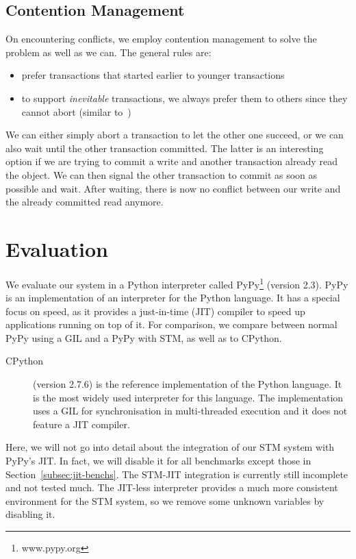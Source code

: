 \documentclass{sigplanconf}
\begin{document}
\subsection{Contention Management\label{subsub:contentionmanagement}}

On encountering conflicts, we employ contention management to solve
the problem as well as we can. The general rules are:
\begin{itemize}[noitemsep]
\item prefer transactions that started earlier to younger transactions
\item to support \emph{inevitable} transactions, we always prefer them
  to others since they cannot abort (similar to~\cite{blundell06})
\end{itemize}
We can either simply abort a transaction to let the other one succeed,
or we can also wait until the other transaction committed. The latter
is an interesting option if we are trying to commit a write and
another transaction already read the object. We can then signal the
other transaction to commit as soon as possible and wait. After
waiting, there is now no conflict between our write and the already
committed read anymore.



\section{Evaluation}

We evaluate our system in a Python interpreter called
PyPy\footnote{www.pypy.org} (version 2.3). PyPy is an implementation of an
interpreter for the Python language. It has a special focus on speed,
as it provides a just-in-time (JIT) compiler to speed up applications
running on top of it. For comparison, we compare between normal PyPy
using a GIL and a PyPy with STM, as well as to CPython.
\begin{description}
\item[CPython] (version 2.7.6) is the reference implementation of the Python
  language. It is the most widely used interpreter for this language.
  The implementation uses a GIL for synchronisation in multi-threaded
  execution and it does not feature a JIT compiler.
\end{description}

Here, we will not go into detail about the integration of our STM
system with PyPy's JIT. In fact, we will disable it for all benchmarks
except those in Section~\ref{subsec:jit-benchs}. The STM-JIT
integration is currently still incomplete and not tested much. The
JIT-less interpreter provides a much more consistent environment for
the STM system, so we remove some unknown variables by disabling it.
\end{document}
